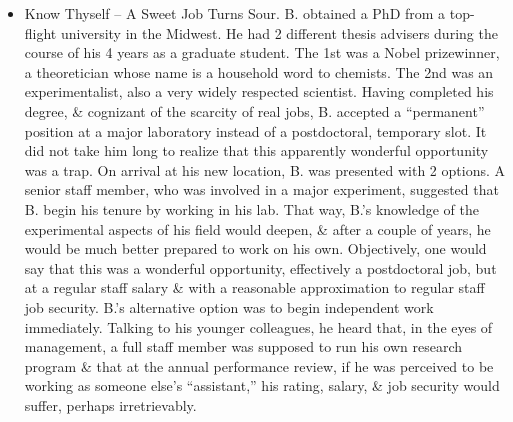 \documentclass{article}
\begin{document}
\begin{enumerate}
\begin{itemize}
\begin{itemize}
			To some extent, T.'s fate was the fault of his adviser. Assigning a long-term project to a postdoctoral researcher who will be on the job market in 18 months is a clear risk to the postdoc's future. But, had T. been as reflective about his career as he was in carrying out his research, he himself would have realized the dangerous path he was taking. As exciting as his assigned project seemed, he would have recognized that his postdoctoral years were the wrong time for such a large effort. At the very least, he would have reversed time each day or week to establish contact with other researchers at the lab \& involved himself in 1 or 2 short-term projects with a clear chance for success. Many a graduate student or postdoc spends time trying to understand what his adviser wants \& getting it done. In fact, it is the young scientists who define \& carry out what {\it they} want, who learn to be scientific leaders, who find the best jobs \& have the most productive \& satisfying careers. Making your thesis or postdoctoral adviser happy is sensible, \& worth doing, but not more so than acting in your own best interests.
			\item {\sf Know Thyself -- A Sweet Job Turns Sour.} B. obtained a PhD from a top-ﬂight university in the Midwest. He had 2 different thesis advisers during the course of his 4 years as a graduate student. The 1st was a Nobel prizewinner, a theoretician whose name is a household word to chemists. The 2nd was an experimentalist, also a very widely respected scientist. Having completed his degree, \& cognizant of the scarcity of real jobs, B. accepted a ``permanent'' position at a major laboratory instead of a postdoctoral, temporary slot. It did not take him long to realize that this apparently wonderful opportunity was a trap. On arrival at his new location, B. was presented with 2 options. A senior staff member, who was involved in a major experiment, suggested that B. begin his tenure by working in his lab. That way, B.'s knowledge of the experimental aspects of his field would deepen, \& after a couple of years, he would be much better prepared to work on his own. Objectively, one would say that this was a wonderful opportunity, effectively a postdoctoral job, but at a regular staff salary \& with a reasonable approximation to regular staff job security. B.'s alternative option was to begin independent work immediately. Talking to his younger colleagues, he heard that, in the eyes of management, a full staff member was supposed to run his own research program \& that at the annual performance review, if he was perceived to be working as someone else's ``assistant,'' his rating, salary, \& job security would suffer, perhaps irretrievably.


\end{itemize}
\end{itemize}
\end{enumerate}
\end{document}
